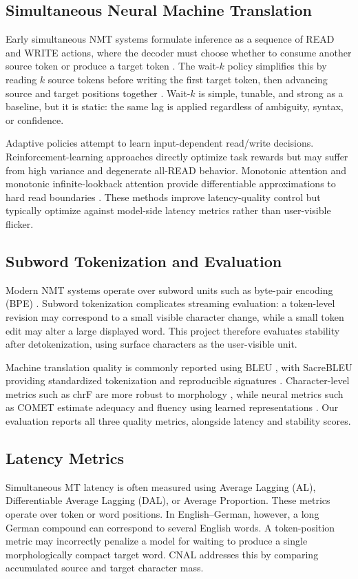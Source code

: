 \documentclass[conference]{IEEEtran}
\begin{document}
\subsection{Simultaneous Neural Machine Translation}
Early simultaneous NMT systems formulate inference as a sequence of READ and WRITE actions, where the decoder must choose whether to consume another source token or produce a target token \cite{gu2017learning}. The wait-$k$ policy simplifies this by reading $k$ source tokens before writing the first target token, then advancing source and target positions together \cite{ma2019stacl}. Wait-$k$ is simple, tunable, and strong as a baseline, but it is static: the same lag is applied regardless of ambiguity, syntax, or confidence.

Adaptive policies attempt to learn input-dependent read/write decisions. Reinforcement-learning approaches directly optimize task rewards but may suffer from high variance and degenerate all-READ behavior. Monotonic attention and monotonic infinite-lookback attention provide differentiable approximations to hard read boundaries \cite{raffel2017online, arivazhagan2019monotonic}. These methods improve latency-quality control but typically optimize against model-side latency metrics rather than user-visible flicker.

\subsection{Subword Tokenization and Evaluation}
Modern NMT systems operate over subword units such as byte-pair encoding (BPE) \cite{sennrich2016bpe}. Subword tokenization complicates streaming evaluation: a token-level revision may correspond to a small visible character change, while a small token edit may alter a large displayed word. This project therefore evaluates stability after detokenization, using surface characters as the user-visible unit.

Machine translation quality is commonly reported using BLEU \cite{papineni2002bleu}, with SacreBLEU providing standardized tokenization and reproducible signatures \cite{post2018call}. Character-level metrics such as chrF are more robust to morphology \cite{popovic2015chrf}, while neural metrics such as COMET estimate adequacy and fluency using learned representations \cite{rei2020comet}. Our evaluation reports all three quality metrics, alongside latency and stability scores.

\subsection{Latency Metrics}
Simultaneous MT latency is often measured using Average Lagging (AL), Differentiable Average Lagging (DAL), or Average Proportion. These metrics operate over token or word positions. In English--German, however, a long German compound can correspond to several English words. A token-position metric may incorrectly penalize a model for waiting to produce a single morphologically compact target word. CNAL addresses this by comparing accumulated source and target character mass.
\end{document}
